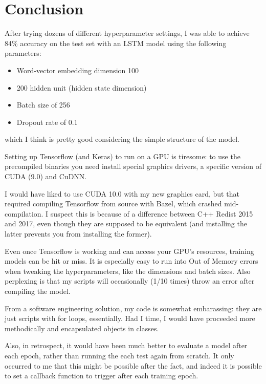 \documentclass[letterpaper, 10pt]{article}
\begin{document}
\section{Conclusion}

After trying dozens of different hyperparameter settings, I was able to achieve
84\% accuracy on the test set with an LSTM model using the following parameters:

\begin{itemize}
  \item Word-vector embedding dimension 100
  \item 200 hidden unit (hidden state dimension)
  \item Batch size of 256
  \item Dropout rate of 0.1
\end{itemize}

 which I think is pretty good considering the
simple structure of the model.

Setting up Tensorflow (and Keras) to run on a GPU is tiresome: to use the
precompiled binaries you need install special graphics drivers,
a specific version of CUDA (9.0) and CuDNN.

I would have liked to use CUDA 10.0 with my new graphics card, but that required
 compiling Tensorflow from source with Bazel, which crashed mid-compilation.
I suspect this is because of a difference between C++ Redist 2015 and 2017,
even though they are supposed to be equivalent (and installing the latter prevents
you from installing the former).

Even once Tensorflow is working and can access your GPU's resources, training
models can be hit or miss. It is especially easy to run
into Out of Memory errors when tweaking the hyperparameters, like the dimensions
and batch sizes. Also perplexing is that my scripts will occasionally (1/10 times)
throw an error after compiling the model.

From a software engineering solution, my code is somewhat embarassing: they
are just scripts with for loops, essentially. Had I time, I would have
proceeded more methodically and encapsulated objects in classes.

Also, in retrospect, it would have been much better to evaluate a model after each epoch,
rather than running the each test again from scratch. It only occurred to me that this
might be possible after the fact, and indeed it is possible to set a callback
function to trigger after each training epoch.
\end{document}
